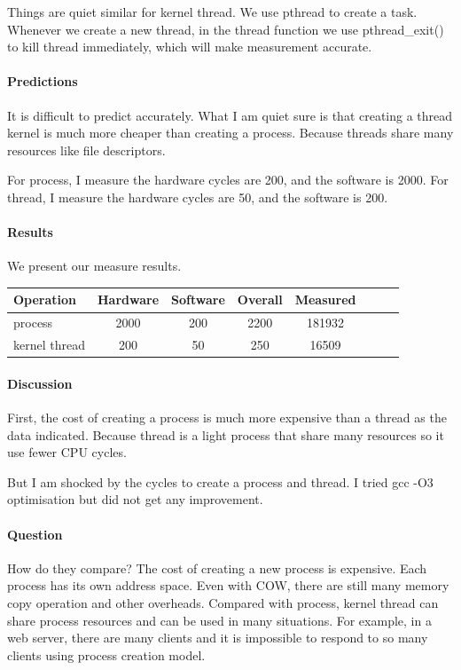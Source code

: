 Things are quiet similar for kernel thread. We use pthread to create a task. Whenever we create a new thread, in the thread function we use pthread\_exit() to kill thread immediately, which will make measurement accurate.

\paragraph{Predictions}
It is difficult to predict accurately. What I am quiet sure is that creating a thread kernel is much more cheaper than creating a process. Because threads share many resources like file descriptors.

For process, I measure the hardware cycles are 200, and the software is 2000.
For thread, I measure the hardware cycles are 50, and the software is 200.

\paragraph{Results}
We present our measure results.

\begin{center}
\begin{tabular}{l*{6}{c}r}
Operation              & Hardware  & Software  & Overall  & Measured   \\
\hline
process & 2000 & 200 & 2200 & 181932  \\
kernel thread    & 200 & 50 & 250 & 16509 \\
\end{tabular}
\end{center}

\paragraph{Discussion}
First, the cost of creating a process is much more expensive than a thread as the data indicated. Because thread is a light process that share many resources so it use fewer CPU cycles.

But I am shocked by the cycles to create a process and thread. I tried gcc -O3 optimisation but did not get any improvement.

\paragraph{Question} How do they compare?
The cost of creating a new process is expensive. Each process has its own address space. Even with COW, there are still many memory copy operation and other overheads. Compared with process, kernel thread can share process resources and can be used in many situations. For example, in a web server, there are many clients and it is impossible to respond to so many clients using process creation model.

